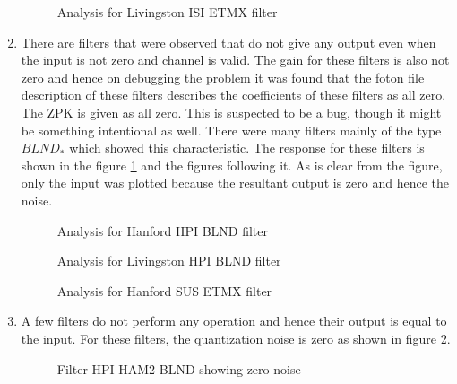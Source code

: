 \documentclass[colorlinks=true,pdfstartview=FitV,linkcolor=blue,
            citecolor=red,urlcolor=magenta]{ligodoc}
\begin{document}
\begin{enumerate}
\begin{figure}[H]
			  \centering
			  \def\svgscale{0.5}
			  \tiny{
			  
			  }
			  \caption{Analysis for Livingston ISI ETMX filter}
		\end{figure}
		\item There are filters that were observed that do not give any output even when the input is not zero and channel is valid. The gain for these filters is also not zero and hence on debugging the problem it was found that the foton file description of these filters describes the coefficients of these filters as all zero. The ZPK is given as all zero. This is suspected to be a bug, though it might be something intentional as well. There were many filters mainly of the type $BLND_*$ which showed this characteristic. The response for these filters is shown in the figure \ref{blnd} and the figures following it. As is clear from the figure, only the input was plotted because the resultant output is zero and hence the noise. 
		\begin{figure}[H]
 
			  \centering
			  \def\svgscale{0.5}
			  \tiny{
			  
			  }
			  \caption{Analysis for Hanford HPI BLND filter}
			 \label{blnd}
		\end{figure}
		\begin{figure}[H]
 
			  \centering
			  \def\svgscale{0.5}
			  \tiny{
			  
			  }
			  \caption{Analysis for Livingston HPI BLND filter}
		\end{figure}
		\begin{figure}[H]
 
			  \centering
			  \def\svgscale{0.5}
			  \tiny{
			  
			  }
			  \caption{Analysis for Hanford SUS ETMX filter}
		\end{figure}
		
	
	\item A few filters do not perform any operation and hence their output is equal to the input. For these filters, the quantization noise is zero as shown in figure \ref{zero}.
		\begin{figure}[H]
 
			  \centering
			  \def\svgscale{0.5}
			  \tiny{
			  
			  }
			  \caption{Filter HPI HAM2 BLND showing zero noise}
			 \label{zero}
		\end{figure}
	\end{enumerate}
\end{document}
